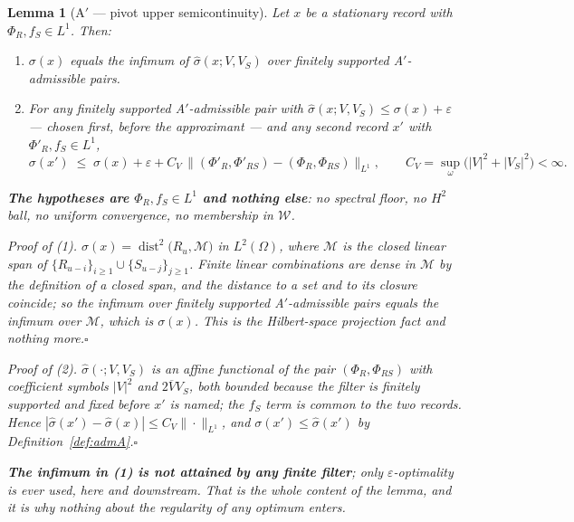 \documentclass[11pt]{article}
\newtheorem{lemma}{Lemma}
\theoremstyle{definition}
\theoremstyle{remark}
\begin{document}
\begin{lemma}[A$'$ --- pivot upper semicontinuity]
\label{lem:Aprime}
Let $x$ be a stationary record with $\Phi_R,f_S\in L^1$. Then:
\begin{enumerate}
\item[(1)] $\sigma(x)$ equals the infimum of $\hat\sigma(x;V,V_S)$ over
\emph{finitely supported} A$'$-admissible pairs.
\item[(2)] For any finitely supported A$'$-admissible pair with
$\hat\sigma(x;V,V_S)\le\sigma(x)+\varepsilon$ --- \emph{chosen first, before
the approximant} --- and any second record $x'$ with $\Phi'_R,f_S\in L^1$,
\[
\sigma(x')\;\le\;\sigma(x)+\varepsilon
+C_V\,\bigl\|(\Phi'_R,\Phi'_{RS})-(\Phi_R,\Phi_{RS})\bigr\|_{L^1},
\qquad C_V=\sup_\omega\bigl(|V|^2+|V_S|^2\bigr)<\infty .
\]
\end{enumerate}
\textbf{The hypotheses are $\Phi_R,f_S\in L^1$ and nothing else}: no spectral
floor, no $H^2$ ball, no uniform convergence, no membership in $\mathcal W$.

\emph{Proof of} (1). $\sigma(x)=\operatorname{dist}^2\bigl(R_u,\mathcal
M\bigr)$ in $L^2(\Omega)$, where $\mathcal M$ is the \emph{closed} linear span
of $\{R_{u-i}\}_{i\ge1}\cup\{S_{u-j}\}_{j\ge1}$. Finite linear combinations
are dense in $\mathcal M$ \emph{by the definition of a closed span}, and the
distance to a set and to its closure coincide; so the infimum over finitely
supported A$'$-admissible pairs equals the infimum over $\mathcal M$, which is
$\sigma(x)$. This is the Hilbert-space projection fact
\cite[Ch.~4]{bib:rudin87} and nothing more.\hfill$\square$

\emph{Proof of} (2). $\hat\sigma(\cdot;V,V_S)$ is an \emph{affine} functional
of the pair $(\Phi_R,\Phi_{RS})$ with coefficient symbols $|V|^2$ and
$2\overline VV_S$, both bounded because the filter is finitely supported and
fixed \emph{before} $x'$ is named; the $f_S$ term is common to the two
records. Hence $|\hat\sigma(x')-\hat\sigma(x)|\le C_V\|\cdot\|_{L^1}$, and
$\sigma(x')\le\hat\sigma(x')$ by Definition~\ref{def:admA}.\hfill$\square$

\textbf{The infimum in (1) is not attained by any finite filter}; only
$\varepsilon$-optimality is ever used, here and downstream. That is the whole
content of the lemma, and it is why nothing about the regularity of any
optimum enters.
\end{lemma}
\end{document}
